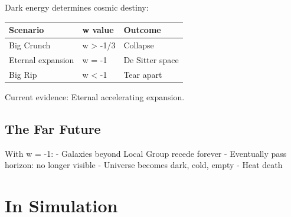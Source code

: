\documentclass[
  11pt,
  letterpaper,
  twoside,
  openright]{book}
\begin{document}
Dark energy determines cosmic destiny:

\begin{longtable}[]{@{}lll@{}}
\toprule\noalign{}
Scenario & w value & Outcome \\
\midrule\noalign{}
\endhead
\bottomrule\noalign{}
\endlastfoot
Big Crunch & w \textgreater{} -1/3 & Collapse \\
Eternal expansion & w = -1 & De Sitter space \\
Big Rip & w \textless{} -1 & Tear apart \\
\end{longtable}

Current evidence: Eternal accelerating expansion.

\subsection{The Far Future}\label{the-far-future}

With w = -1: - Galaxies beyond Local Group recede forever - Eventually
pass horizon: no longer visible - Universe becomes dark, cold, empty -
Heat death

\section{In Simulation}\label{in-simulation-20}
\end{document}
